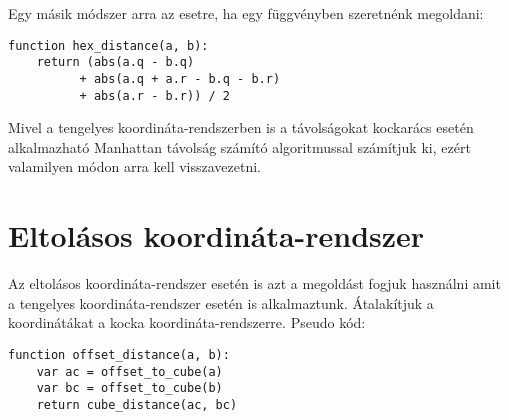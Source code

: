 \noindent Egy másik módszer arra az esetre, ha egy függvényben szeretnénk megoldani:
\begin{verbatim} 
function hex_distance(a, b):
    return (abs(a.q - b.q) 
          + abs(a.q + a.r - b.q - b.r)
          + abs(a.r - b.r)) / 2
\end{verbatim}          

\noindent Mivel a tengelyes koordináta-rendszerben is a távolságokat kockarács esetén alkalmazható Manhattan távolság számító algoritmussal számítjuk ki, ezért valamilyen módon arra kell visszavezetni.

\section{Eltolásos koordináta-rendszer}

Az eltolásos koordináta-rendszer esetén is azt a megoldást fogjuk használni amit a tengelyes koordináta-rendszer esetén is alkalmaztunk. Átalakítjuk a koordinátákat a kocka koordináta-rendszerre.
\newline
\newline Pseudo kód:
\begin{verbatim} 
function offset_distance(a, b):
    var ac = offset_to_cube(a)
    var bc = offset_to_cube(b)
    return cube_distance(ac, bc)
\end{verbatim}  
